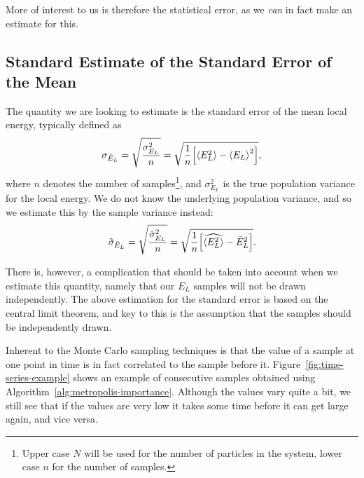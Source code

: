 \documentclass[twocolumn]{article}
\begin{document}
More of interest to us is therefore the statistical error, as we \textit{can} in
fact make an estimate for this. 

\subsection{Standard Estimate of the Standard Error of the Mean}

The quantity we are looking to estimate is the
standard error of the mean local energy, typically defined as
\begin{align}
    \sigma_{\bar E_L} = \sqrt{\frac{\sigma_{E_L}^2}{n}}= \sqrt{\frac{1}{n}
    \qty[\expval{E_L^2} - \expval{E_L}^2]} \label{eq:SE-def},
\end{align}
where $n$ denotes the number of samples\footnote{Upper case $N$ will be used for
the number of particles in the system, lower case $n$ for the number of
samples.}, and $\sigma_{E_L}^2$ is the true population variance for the local energy. We
do not know the underlying population variance, and so we estimate this by the
sample variance instead:
\begin{align}
    \hat\sigma_{\bar E_L} = \sqrt{\frac{\hat\sigma_{E_L}^2}{n}}=
    \sqrt{\frac{1}{n}
    \qty[\widehat{\expval{E_L^2}} - \bar{E}_L^2]}
    \label{eq:SE-est-def}.
\end{align}

There is, however, a complication that should be taken into account when we
estimate this quantity, namely that our $E_L$ samples will not be drawn
independently. The above estimation for the standard error is based on the
central limit theorem, and key to this is the assumption that the samples should
be independently drawn. 

Inherent to the Monte Carlo sampling techniques is that the value
of a sample at one point in time is in fact correlated to the sample before it.
Figure~\ref{fig:time-series-example} shows an example of consecutive samples
obtained using Algorithm~\ref{alg:metropolis-importance}. Although the values
vary quite a bit, we still see that if the values are very low it takes some
time before it can get large again, and vice versa.
\end{document}

